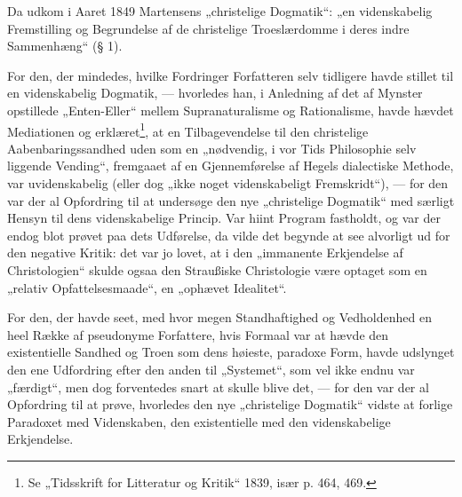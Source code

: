 \documentclass[12pt,a4paper]{book}
\newcommand{\opage}[1]{\marginnote{\footnotesize\textit{[#1]}}}
\begin{document}
Da udkom i Aaret 1849 Martensens „christelige Dogmatik“: „en videnskabelig Fremstilling og Begrundelse af de christelige Troeslærdomme i deres indre Sammenhæng“ (§ 1).

For den, der mindedes, hvilke Fordringer Forfatteren selv tidligere havde stillet til en videnskabelig Dogmatik, --- hvorledes han, i Anledning af det af Mynster opstillede „Enten-Eller“ mellem Supranaturalisme og Rationalisme, havde hævdet Mediationen og erklæret\footnote{Se „Tidsskrift for Litteratur og Kritik“ 1839, især p. 464, 469.}, at en Tilbagevendelse til den christelige Aabenbaringssandhed uden som en „nødvendig, i vor Tids Philosophie selv liggende Vending“, fremgaaet af en Gjennemførelse af Hegels dialectiske Methode, var uvidenskabelig (eller dog „ikke noget videnskabeligt Fremskridt“), --- for den var der al Opfordring til at undersøge den nye „christelige Dogmatik“ med særligt Hensyn til dens videnskabelige Princip. Var hiint Program fastholdt, og var der endog blot prøvet paa dets Udførelse, da vilde det begynde at see alvorligt ud for den negative Kritik: det var jo lovet, at i den „immanente Erkjendelse af Christologien“ skulde ogsaa den Straußiske Christologie være optaget som en „relativ Opfattelsesmaade“, en „ophævet Idealitet“.

For den, der havde seet, med hvor megen Standhaftighed og Vedholdenhed en heel Række af pseudonyme Forfattere, hvis Formaal var at hævde den existentielle Sandhed og Troen som dens høieste, paradoxe Form, havde udslynget den ene Udfordring efter den anden til „Systemet“, som vel ikke endnu var „færdigt“, men dog forventedes snart at skulle blive det, --- for den var der al Opfordring til at prøve, hvorledes
\opage{26}\setcounter{footnote}{0}%
den nye „christelige Dogmatik“ vidste at forlige Paradoxet med Videnskaben, den existentielle med den videnskabelige Erkjendelse.
\end{document}
